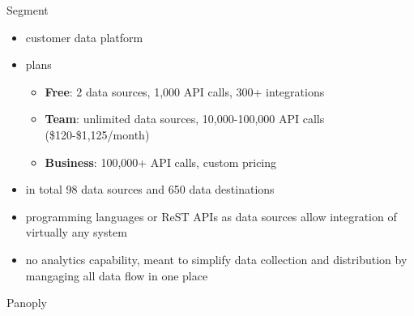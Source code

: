 \documentclass[aspectratio=169]{beamer}
\begin{document}
  \begin{frame}{Segment}
		\begin{itemize}
      \item customer data platform
      \item plans
		  \begin{itemize}
        \item \textbf{Free}: 2 data sources, 1,000 API calls, 300+ integrations
        \item \textbf{Team}: unlimited data sources, 10,000-100,000 API calls (\$120-\$1,125/month)
        \item \textbf{Business}: 100,000+ API calls, custom pricing
      \end{itemize}
      \item in total 98 data sources and 650 data destinations
      \item programming languages or ReST APIs as data sources allow integration of virtually any system
      \item no analytics capability, meant to simplify data collection and distribution by mangaging all data flow in one place
    \end{itemize}
  \end{frame}

  \begin{frame}{Panoply}

  \end{frame}
\end{document}
